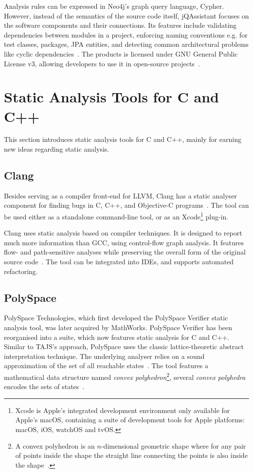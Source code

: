 Analysis rules can be expressed in Neo4j's graph query language, Cypher. However, instead of the semantics of the source code itself, jQAssistant focuses on the software components and their connections. Its features include validating dependencies between modules in a project, enforcing naming conventions e.g. for test classes, packages, JPA entities, and detecting common architectural problems like cyclic dependencies~\cite{jqassistant-documentation}. The products is licensed under GNU General Public License v3, allowing developers to use it in open-source projects~\cite{gplv3}.


\section{Static Analysis Tools for C and C++}

This section introduces static analysis tools for C and C++, mainly for earning new ideas regarding static analysis.


\subsection{Clang}

Besides serving as a compiler front-end for LLVM, Clang has a static analyser component for finding bugs in C, C++, and Objective-C programs~\cite{clang-analyser-website}. The tool can be used either as a standalone command-line tool, or as an Xcode\footnote{Xcode is Apple's integrated development environment only available for Apple's macOS, containing a suite of development tools for Apple platforms: macOS, iOS, watchOS and tvOS.} plug-in.

Clang uses static analysis based on compiler techniques. It is designed to report much more information than GCC, using control-flow graph analysis. It features flow- and path-sensitive analyses while preserving the overall form of the original source code~\cite{kremenek2008finding}. The tool can be integrated into IDEs, and supports automated refactoring.


\subsection{PolySpace}

PolySpace Technologies, which first developed the PolySpace Verifier static analysis tool, was later acquired by MathWorks. PolySpace Verifier has been reorganised into a suite, which now features static analysis for C and C++. Similar to TAJS's approach, PolySpace uses the classic lattice-theoretic abstract interpretation technique. The underlying analyser relies on a sound approximation of the set of all reachable states~\cite{emanuelsson2008comparative}. The tool features a mathematical data structure named \emph{convex polyhedron}\footnote{A convex polyhedron is an $n$-dimensional geometric shape where for any pair of points inside the shape the straight line connecting the points is also inside the shape~\cite{emanuelsson2008comparative}.}, several \emph{convex polyhedra} encodes the sets of states~\cite{cousot1978automatic}.

